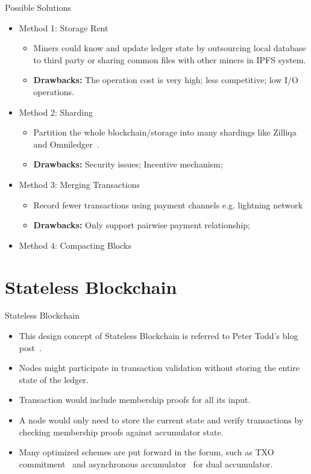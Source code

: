 \documentclass[biblatex,aspectratio=169,11pt]{mybeamer}
\begin{document}
\begin{frame}{Possible Solutions}
  \begin{itemize}[<+->]
    \item Method 1: \alert{Storage Rent}
     \begin{itemize}[<+->]
       \item Miners could know and update ledger state by outsourcing local database to third party or sharing common files with other miners in IPFS system.
       \item \textbf{Drawbacks:} The operation cost is very high; less competitive; low I/O operations.
     \end{itemize}
     \item Method 2: \alert{Sharding}
      \begin{itemize}[<+->]
        \item Partition the whole blockchain/storage into many shardings like Zilliqa~\cite{zilliqa2017zilliqa} and Omniledger~\cite{kokoris2018omniledger}.
        \item \textbf{Drawbacks:} Security issues; Incentive mechanism;
      \end{itemize}
     \item Method 3: \alert{Merging Transactions} 
      \begin{itemize}[<+->]
        \item Record fewer transactions using payment channels e.g. lightning network~\cite{poon2016bitcoin}
        \item \textbf{Drawbacks:} Only support pairwise payment relationship;
      \end{itemize}
     \item Method 4: \alert{Compacting Blocks}~\cite{poelstra2016mimblewimble}
  \end{itemize}
\end{frame}


\section{Stateless Blockchain}

\begin{frame}{Stateless Blockchain}
  \begin{itemize}
   \item This design concept of \alert{Stateless Blockchain} is referred to Peter Todd's blog post~\cite{Tod}. 
   \item Nodes might participate in transaction validation without storing the entire state of the ledger.
   \item Transaction would include membership proofs for all its input.
   \item A node would only need to store the current state and verify transactions by checking membership proofs against accumulator state.
   \item Many optimized schemes are put forward in the forum, such as TXO commitment~\cite{MMR} and asynchronous accumulator~\cite{reyzin2016efficient} for dual accumulator.
 \end{itemize}
\end{frame}
\end{document}
